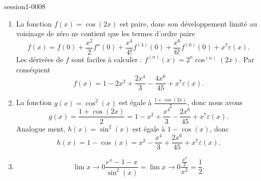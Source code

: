 
\begin{corrige}{session1-0008}

 \begin{enumerate}
  \item  La fonction $f(x) = \cos(2x)$  est paire, donc son développement limité au voisinage de zéro ne contient que les termes d'ordre paire
    \begin{equation*}
      f(x) = f(0) + \frac{x^2}{2} f''(0) + \frac{x^4}{4!} f^{(4)}(0) + \frac{x^6}{6!} f^{(6)}(0) + x^7\varepsilon(x).  
    \end{equation*}
Les dérivées de $f$ sont faciles \`a calculer  : $f^{(n)}(x) = 2^n \cos^{(n)}(2x) $. Par conséquent 
\begin{equation*}
      f(x) = 1 -2x^2  + \frac{2x^4}{3}  - \frac{4x^6}{45} + x^7\varepsilon(x).  
    \end{equation*}
  \item La fonction $g(x) = \cos^2(x)$ est égale \`a $\frac{1 + \cos(2x)}{2}$, donc nous avons 
    \begin{equation*}
      g(x) = \frac{1 + \cos(2x)}{2} = 1 -x^2  + \frac{x^4}{3}  - \frac{2x^6}{45} + x^7\varepsilon(x).
    \end{equation*}
Analogue ment,  $h(x) = \sin^2(x)$ est égale \`a $1-\cos(x)$, donc 
\begin{equation*}
      h(x) = 1-\cos(x) = x^2  - \frac{x^4}{3}  + \frac{2x^6}{45} + x^7\varepsilon(x).
    \end{equation*}
  \item 
    \begin{equation*}
      \lim{x\to 0}\frac{e^x-1-x}{\sin^2(x)} = \lim{x\to 0}\frac{\frac{x^2}{2}}{ x^2} = \frac{1}{2} .
    \end{equation*}
  \end{enumerate}

\end{corrige}
